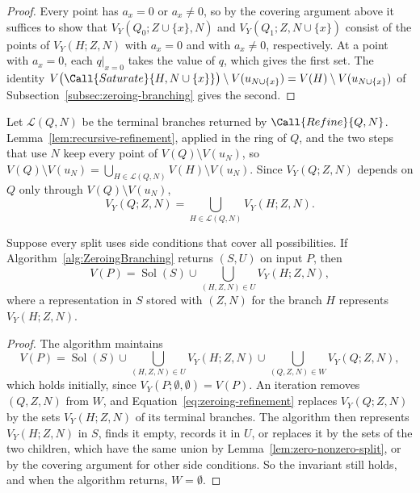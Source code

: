 \begin{proof}
  Every point has $a_x=0$ or $a_x\neq0$, so by the covering argument above it
  suffices to show that $V_Y(Q_0;Z\cup\{x\},N)$ and $V_Y(Q_1;Z,N\cup\{x\})$
  consist of the points of $V_Y(H;Z,N)$ with $a_x=0$ and with $a_x\neq0$,
  respectively. At a point with $a_x=0$, each $q|_{x=0}$ takes the value of
  $q$, which gives the first set. The
  identity
  $V\bigl(\Call{Saturate}{H,N\cup\{x\}}\bigr)\setminus V(u_{N\cup\{x\}})
  =V(H)\setminus V(u_{N\cup\{x\}})$ of
  Subsection~\ref{subsec:zeroing-branching} gives the second.
\end{proof}

Let $\mathcal L(Q,N)$ be the terminal branches returned by
$\Call{Refine}{Q,N}$. Lemma~\ref{lem:recursive-refinement}, applied in the ring
of $Q$, and the two steps that use $N$ keep every point of
$V(Q)\setminus V(u_N)$, so
$V(Q)\setminus V(u_N)=\bigcup_{H\in\mathcal L(Q,N)}V(H)\setminus V(u_N)$.
Since $V_Y(Q;Z,N)$ depends on $Q$ only through $V(Q)\setminus V(u_N)$,
\begin{equation}
  \label{eq:zeroing-refinement}
  V_Y(Q;Z,N)=\bigcup_{H\in\mathcal L(Q,N)}V_Y(H;Z,N).
\end{equation}

\begin{theorem}
  \label{thm:zeroing-correctness}
  Suppose every split uses side conditions that cover all possibilities. If
  Algorithm~\ref{alg:ZeroingBranching} returns $(S,U)$ on input $P$, then
  \[
    V(P)=\operatorname{Sol}(S)
    \cup\bigcup_{(H,Z,N)\in U}V_Y(H;Z,N),
  \]
  where a representation in $S$ stored with $(Z,N)$ for the branch $H$
  represents $V_Y(H;Z,N)$.
\end{theorem}

\begin{proof}
  The algorithm maintains
  \[
    V(P)=\operatorname{Sol}(S)
    \cup\bigcup_{(H,Z,N)\in U}V_Y(H;Z,N)
    \cup\bigcup_{(Q,Z,N)\in W}V_Y(Q;Z,N),
  \]
  which holds initially, since $V_Y(P;\emptyset,\emptyset)=V(P)$. An iteration
  removes $(Q,Z,N)$ from $W$, and Equation~\eqref{eq:zeroing-refinement}
  replaces $V_Y(Q;Z,N)$ by the sets $V_Y(H;Z,N)$ of its terminal branches. The
  algorithm then represents $V_Y(H;Z,N)$ in $S$, finds it empty, records it in
  $U$, or replaces it by the sets of the two children, which have the same
  union by Lemma~\ref{lem:zero-nonzero-split}, or by the covering argument for
  other side conditions. So the invariant still holds, and when the algorithm
  returns, $W=\emptyset$.
\end{proof}

